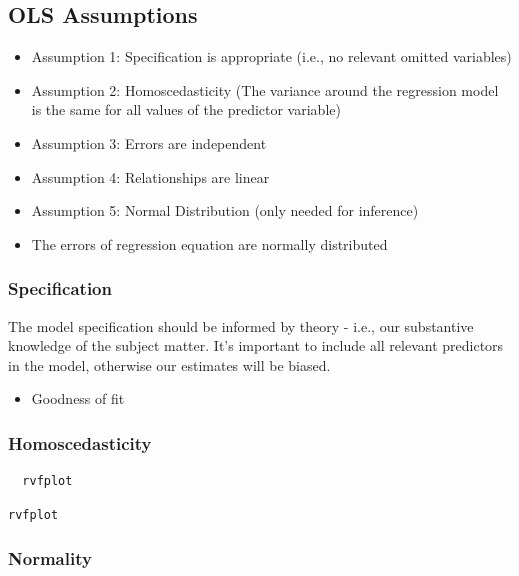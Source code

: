 \documentclass[]{book}
\providecommand{\tightlist}{%
  \setlength{\itemsep}{0pt}\setlength{\parskip}{0pt}}
\begin{document}
\subsection{OLS Assumptions}\label{ols-assumptions}

\begin{itemize}
\tightlist
\item
  Assumption 1: Specification is appropriate (i.e., no relevant omitted
  variables)
\item
  Assumption 2: Homoscedasticity (The variance around the regression
  model is the same for all values of the predictor variable)
\item
  Assumption 3: Errors are independent
\item
  Assumption 4: Relationships are linear
\item
  Assumption 5: Normal Distribution (only needed for inference)
\item
  The errors of regression equation are normally distributed
\end{itemize}

\subsubsection{Specification}\label{specification}

The model specification should be informed by theory - i.e., our
substantive knowledge of the subject matter. It's important to include
all relevant predictors in the model, otherwise our estimates will be
biased.

\begin{itemize}
\tightlist
\item
  Goodness of fit
\end{itemize}

\subsubsection{Homoscedasticity}\label{homoscedasticity}

\begin{verbatim}
  rvfplot
\end{verbatim}

\begin{verbatim}
rvfplot
\end{verbatim}

\subsubsection{Normality}\label{normality}
\end{document}
